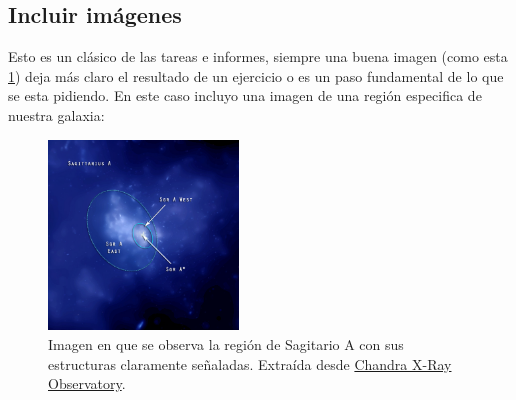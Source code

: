 \documentclass[11pt,letterpaper]{article}
\begin{document}
\begin{multicols}{2}
\subsection*{Incluir imágenes}
Esto es un clásico de las tareas e informes, siempre una buena imagen (como esta \ref{fig1}) deja más claro el resultado de un ejercicio o es un paso fundamental de lo que se esta pidiendo. En este caso incluyo una imagen de una región especifica de nuestra galaxia:
\begin{figure}[H]
        \centering
        \includegraphics[width=0.45\textwidth]{foto.jpg}
        \caption{Imagen en que se observa la región de Sagitario A con sus estructuras claramente señaladas. Extraída desde \href{https://chandra.harvard.edu/photo/2003/0203long/more.html}{Chandra X-Ray Observatory}.}
        \label{fig1}
\end{figure}


\newpage



\end{multicols}
\end{document}
